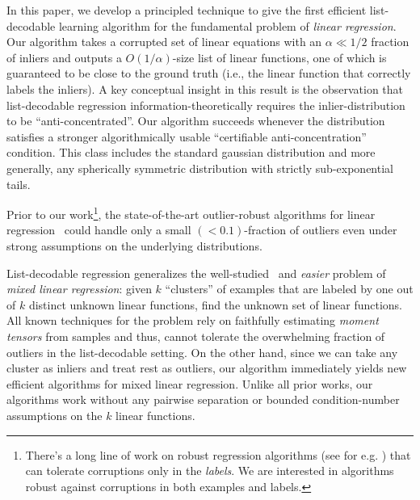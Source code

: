 In this paper, we develop a principled technique to give the first efficient list-decodable learning algorithm for the fundamental problem of \emph{linear regression}. Our algorithm takes a corrupted set of linear equations with an $\alpha \ll 1/2$ fraction of inliers and outputs a $O(1/\alpha)$-size list of linear functions, one of which is guaranteed to be close to the ground truth (i.e., the linear function that correctly labels the inliers). A key conceptual insight in this result  is the observation that list-decodable regression information-theoretically requires the inlier-distribution to be ``anti-concentrated''. Our algorithm succeeds whenever the distribution satisfies a stronger algorithmically usable ``certifiable anti-concentration'' condition. This class includes the standard gaussian distribution and more generally, any spherically symmetric distribution with strictly sub-exponential tails.

Prior to our work\footnote{There's a long line of work on robust regression algorithms (see for e.g. \cite{DBLP:conf/nips/Bhatia0KK17,conf/soda/KarmalkarP19}) that can tolerate corruptions only in the \emph{labels}. We are interested in algorithms robust against corruptions in both examples and labels.}, the state-of-the-art outlier-robust algorithms for linear regression~\cite{DBLP:conf/colt/KlivansKM18,conf/soda/DiakonikolasKS19,journals/corr/abs-1803-02815,journals/corr/abs-1802-06485} could handle only a small $(<0.1)$-fraction of outliers even under strong assumptions on the underlying distributions. 

List-decodable regression generalizes the well-studied~\cite{MR1028403,doi:10.1162/neco.1994.6.2.181,MR2757044,2013arXiv1310.3745Y,DBLP:journals/corr/BalakrishnanWY14,DBLP:conf/colt/ChenYC14,DBLP:conf/nips/Zhong0D16,DBLP:conf/aistats/SedghiJA16,DBLP:conf/colt/LiL18} and {\em easier} problem of \emph{mixed linear regression}: given $k$ ``clusters'' of examples that are labeled by one out of $k$ distinct unknown linear functions, find the unknown set of linear functions. All known techniques for the problem rely on faithfully estimating \emph{moment tensors} from samples and thus, cannot tolerate the overwhelming fraction of outliers in the list-decodable setting. On the other hand, since we can take any cluster as inliers and treat rest as outliers, our algorithm immediately yields new efficient algorithms for mixed linear regression. Unlike all prior works, our algorithms work without any pairwise separation or bounded condition-number assumptions on the $k$ linear functions. 








